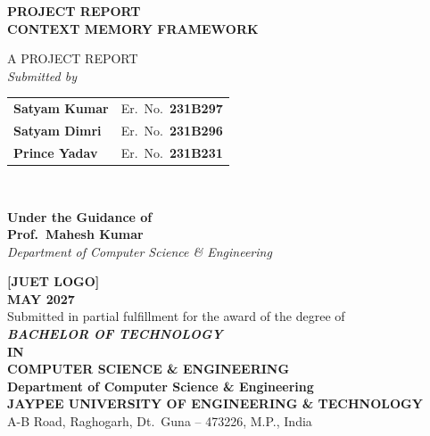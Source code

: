 \begin{titlepage}
\begin{center}

{\fontsize{18}{27}\selectfont \textbf{PROJECT REPORT}\\}
\vspace{0.5cm}
{\fontsize{18}{27}\selectfont \textbf{CONTEXT MEMORY FRAMEWORK}\\}

\vspace{1.2cm}
{\fontsize{14}{21}\selectfont A PROJECT REPORT\\}
\vspace{1.0cm}
{\fontsize{14}{21}\selectfont \textit{Submitted by}\\}
\vspace{0.5cm}
{\fontsize{14}{21}\selectfont
\begin{tabular}{ll}
    \textbf{Satyam Kumar}  & Er.\ No.\ \textbf{231B297} \\[6pt]
    \textbf{Satyam Dimri}  & Er.\ No.\ \textbf{231B296} \\[6pt]
    \textbf{Prince Yadav}  & Er.\ No.\ \textbf{231B231} \\
\end{tabular}\\}

\vspace{1.0cm}
{\fontsize{14}{21}\selectfont \textbf{Under the Guidance of}\\}
\vspace{0.3cm}
{\fontsize{16}{24}\selectfont \textbf{Prof.\ Mahesh Kumar}\\}
{\fontsize{12}{18}\selectfont \textit{Department of Computer Science \& Engineering}\\}

\vfill

{\fontsize{13}{20}\selectfont \textbf{[JUET LOGO]}\\}
\vspace{0.5cm}
{\fontsize{14}{21}\selectfont \textbf{MAY 2027}\\}
\vspace{0.8cm}
{\fontsize{13}{20}\selectfont Submitted in partial fulfillment for the award of the degree of\\}
\vspace{0.3cm}
{\fontsize{15}{22}\selectfont \textbf{\textit{BACHELOR OF TECHNOLOGY}}\\}
{\fontsize{13}{20}\selectfont \textbf{IN}\\}
{\fontsize{13}{20}\selectfont \textbf{COMPUTER SCIENCE \& ENGINEERING}\\}
\vspace{0.8cm}
{\fontsize{14}{21}\selectfont \textbf{Department of Computer Science \& Engineering}\\}
{\fontsize{13}{20}\selectfont \textbf{JAYPEE UNIVERSITY OF ENGINEERING \& TECHNOLOGY}\\}
{\fontsize{13}{20}\selectfont A-B Road, Raghogarh, Dt.\ Guna -- 473226, M.P., India\\}

\end{center}
\end{titlepage}
